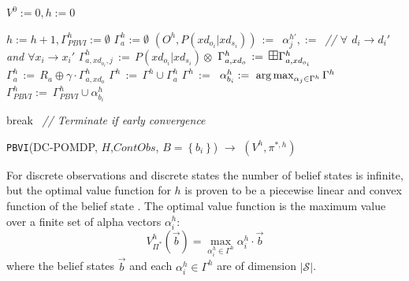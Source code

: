 \documentclass{article} %
\def\argmax{\operatornamewithlimits{arg\max}}
\begin{document}
\begin{algorithm}[t!]
\vspace{-.5mm}
\dontprintsemicolon
{}
\Begin
{
   $V^0:=0, h:=0$\;
   {
       $h:=h+1, \Gamma_{PBVI}^h :=\emptyset$\;
       {
      	 {
			$\Gamma_{a}^h :=\emptyset$ \;       		
       			{$(O^h,P(xd_{o_i}|xd_{s_i})) \,:=\,$ \;}
       		 {
       			{
   	 		  		$\alpha_j^{h'},:=\,$  
   	 		  		\emph{// $\forall$ $d_i \to d_i'$ and $\forall x_i \to x_i'$} \; 
   	 		    	$\Gamma_{a,xd_{o_i},j}^h \,:=\, P(xd_{o_i}|xd_{s_i}) \otimes$ \;
       	      	}
       	      	$\Gamma_{a,xd_o}^h\,:=\,\textrm{\large $\boxplus$} \Gamma_{a,xd_{o_i}}^h$\;
       	     }
           $\Gamma_a^{h} \,:=\,R_a \oplus \gamma \cdot \Gamma_{a,xd_o}^h$\;
            $\Gamma^{h} \,:=\, \Gamma^{h} \cup \Gamma_a^{h}$\;
       	 }  
              $\Gamma^h \,:=\, $ \;
      }
      {
     	$\alpha_{b_i}^h :=\ \argmax_{\alpha_j \in \Gamma^h} \Gamma^{h}$\;
     	$\Gamma_{PBVI}^h :=\ \Gamma_{PBVI}^h \cup \alpha_{b_i}^h$\;
      }

           {break $\,$ \emph{// Terminate if early convergence}\;}
   }
      \;
}
\caption{\footnotesize \texttt{PBVI}(DC-POMDP, $H$,$ContObs$, $B=\left\{b_i \right\}$) $\longrightarrow$ $(V^h,\pi^{*,h})$ \label{alg:vi}}
\vspace{-1mm}
\end{algorithm}
\decmargin{.5em}

For discrete observations and discrete states the number of belief states is infinite, but the optimal value function for $h$ is proven to be a piecewise linear and convex function of the belief state \cite{smallwoodSondik}. The optimal value function is the maximum value over a finite set of alpha vectors  $\alpha^h_i$:%
{\footnotesize
\begin{equation}
V^h_{\Pi^*}(\vec{b}) = \max_{\alpha^h_i \in \Gamma^h} \alpha^h_i \cdot \vec{b}
\end{equation}
}
where the belief states $\vec{b}$ and each $\alpha^h_i \in \Gamma^h$ are of dimension $|\mathcal{S}|$. 
\end{document}
